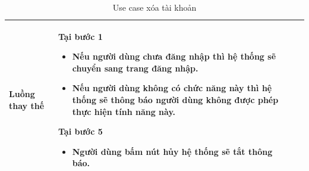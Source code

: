 \documentclass[12pt,a4paper]{article}
\begin{document}
\begin{table}[H]
\begin{tabular}{|p{3.5cm}|p{11.5cm}|c|}
            \hline
            Luồng thay thế & Tại bước 1\newline
            \vspace{-.8cm}\begin{itemize}
                              \item Nếu người dùng chưa đăng nhập thì hệ thống sẽ chuyển sang trang đăng nhập.
                              \item Nếu người dùng không có chức năng này thì hệ thống sẽ thông báo người dùng không được phép thực hiện tính năng này.
            \end{itemize}
            Tại bước 5\newline
            \vspace{-.8cm}\begin{itemize}
                              \item Người dùng bấm nút hủy hệ thống sẽ tắt thông báo.
            \end{itemize} \\
            \hline
        \end{tabular}
        \caption{Use case xóa tài khoản }
    \end{table}


\end{document}

